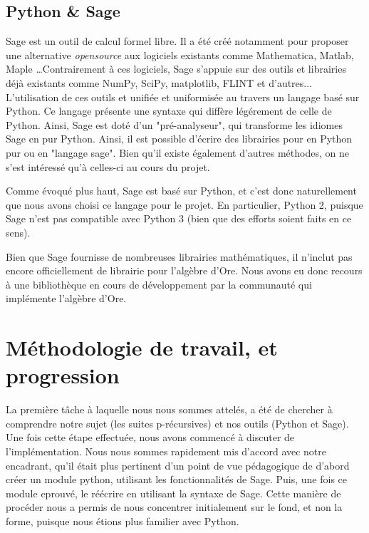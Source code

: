 \documentclass[final,12pt]{article}
\begin{document}
    \subsection{Python \& Sage}
        \label{ssec:sage}
        \par Sage est un outil de calcul formel libre.
        Il a été créé notamment pour proposer
        une alternative \textit{opensource} aux logiciels existants comme Mathematica,
        Matlab, Maple \ldots Contrairement à ces logiciels, Sage s'appuie sur des outils
        et librairies déjà existants comme NumPy, SciPy, matplotlib, FLINT et d'autres...
        L'utilisation de ces outils et unifiée et uniformisée au travers un langage
        basé sur Python. Ce langage présente une syntaxe qui diffère légérement de celle
        de Python. Ainsi, Sage est doté d'un "pré-analyseur",
        qui transforme les idiomes Sage en pur Python.
        Ainsi, il est possible d'écrire des librairies pour en Python pur ou en "langage sage".
        Bien qu'il existe également d'autres méthodes, on ne s'est intéressé qu'à celles-ci au
        cours du projet.
        \par Comme évoqué plus haut, Sage est basé sur Python, et c'est donc naturellement
        que nous avons choisi ce langage pour le projet.
        En particulier, Python 2, puisque Sage n'est pas compatible avec Python 3
        (bien que des efforts soient faits en ce sens).
        \par Bien que Sage fournisse de nombreuses librairies mathématiques,
        il n'inclut pas encore officiellement de librairie pour l'algèbre d'Ore.
        Nous avons eu donc recours à une bibliothèque en cours de développement par
        la communauté qui implémente l'algèbre d'Ore. %
\section{Méthodologie de travail, et progression}
    \label{sec:methodo}
    La première tâche à laquelle nous nous sommes attelés, a été de chercher à comprendre notre sujet
    (les suites p-récursives) et nos outils (Python et Sage). Une fois cette étape effectuée, nous avons
    commencé à discuter de l'implémentation. Nous nous sommes rapidement mis d'accord avec notre encadrant,
    qu'il était plus pertinent d'un point de vue pédagogique de d'abord créer un module python,
    utilisant les fonctionnalités de Sage. Puis, une fois ce module eprouvé, le réécrire 
    en utilisant la syntaxe de Sage. Cette manière de procéder nous a permis de nous concentrer initialement
    sur le fond, et non la forme, puisque nous étions plus familier avec Python.
\end{document}
